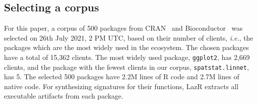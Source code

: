 \documentclass[review,nonacm,screen,acmsmall,anonymous=true]{acmart}
\renewcommand{\c}[1]{\lstinline |#1|\xspace}
\newcommand{\lazr}{{\sf LazR}\xspace}
\begin{document}
\subsection{Selecting a corpus}\label{sec:corpus}

For this paper, a corpus of 500 packages from CRAN~\cite{ligges2017} and
Bioconductor~\cite{bioc} was selected on 26th July 2021, 2 PM UTC, based on
their number of clients, \emph{i.e.}, the packages which are the most widely
used in the ecosystem. The chosen packages have a total of 15,362 clients. The
most widely used package, \c{ggplot2}, has 2,669 clients, and the package with
the fewest clients in our corpus, \c{spatstat.linnet}, has 5. The selected 500
packages have 2.2M lines of R code and 2.7M lines of native code. For
synthesizing signatures for their functions, \lazr extracts all executable
artifacts from each package.
\end{document}
